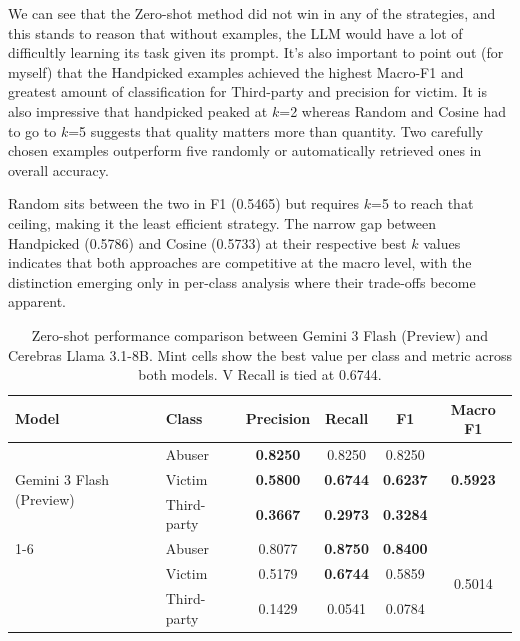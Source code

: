 \documentclass[12pt]{article}
\begin{document}
We can see that the Zero-shot method did not win in any of the strategies, and this stands to reason 
that without examples, the LLM would have a lot of difficultly learning its task given its prompt. 
It's also important to point out (for myself) that the Handpicked examples achieved the highest 
Macro-F1 and greatest amount of classification for Third-party and precision for victim. It is 
also impressive that handpicked peaked at $k$=2 whereas Random and Cosine had to go to $k$=5 suggests that 
quality matters more than quantity. Two carefully chosen examples outperform five randomly or 
automatically retrieved ones in overall accuracy. 

Random sits between the two in F1 (0.5465) but requires $k$=5 to reach that ceiling, 
making it the least efficient strategy. The narrow gap between Handpicked (0.5786) and Cosine 
(0.5733) at their respective best $k$ values indicates that both approaches are competitive 
at the macro level, with the distinction emerging only in per-class analysis where their 
trade-offs become apparent.

\begin{table}[H]
    \centering
    \renewcommand{\arraystretch}{1.4}
    \begin{tabular}{l l c c c c}
        \toprule
        \rowcolor{llmheader}
        \color{white}\textbf{Model} & \color{white}\textbf{Class} & \color{white}\textbf{Precision} & \color{white}\textbf{Recall} & \color{white}\textbf{F1} & \color{white}\textbf{Macro F1} \\
        \midrule
        \multirow{3}{*}{Gemini 3 Flash (Preview)}
            & Abuser      & \cellcolor{llmhighlight}\textbf{0.8250} & 0.8250 & 0.8250 &  \\
            & Victim      & \cellcolor{llmhighlight}\textbf{0.5800} & \cellcolor{llmhighlight}\textbf{0.6744} & \cellcolor{llmhighlight}\textbf{0.6237} & \textbf{0.5923} \\
            & Third-party & \cellcolor{llmhighlight}\textbf{0.3667} & \cellcolor{llmhighlight}\textbf{0.2973} & \cellcolor{llmhighlight}\textbf{0.3284} & \\
        \cmidrule{1-6}
        \multirow{3}{*}{Cerebras Llama 3.1-8B}
            & Abuser      & 0.8077 & \cellcolor{llmhighlight}\textbf{0.8750} & \cellcolor{llmhighlight}\textbf{0.8400} & \multirow{3}{*}{0.5014} \\
            & Victim      & 0.5179 & \cellcolor{llmhighlight}\textbf{0.6744} & 0.5859 & \\
            & Third-party & 0.1429 & 0.0541 & 0.0784 & \\
        \bottomrule
    \end{tabular}
    \caption{Zero-shot performance comparison between Gemini 3 Flash (Preview) and Cerebras
    Llama 3.1-8B. Mint cells show the best value per class and metric across both models.
    V Recall is tied at 0.6744.}
    \label{tab:model-zeroshot}
\end{table}
\end{document}
